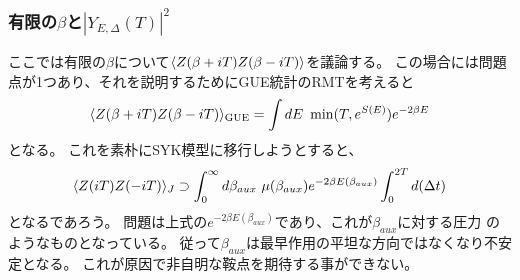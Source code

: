 \subsubsection{有限の$\beta$と$|Y_{E,\Delta}(T)|^2$}
ここでは有限の$\beta$について$\langle Z(\beta + iT)Z(\beta - iT) \rangle$を議論する。
この場合には問題点が1つあり、それを説明するためにGUE統計のRMTを考えると
\begin{align}
	\langle Z(\beta + iT)Z(\beta - iT) \rangle_{\mathrm{GUE}}
	=\int dE\ \min(T, e^{S(E)})e^{-2\beta E}
\end{align}
となる。
これを素朴にSYK模型に移行しようとすると、
\begin{align}
	\langle Z(iT)Z(-iT) \rangle_J \supset
	\int_0^{\infty}d\beta_{aux}\ \mu(\beta_{aux})e^{-2\beta E(\beta_{aux})}
	\int_0^{2T} d(\Delta t)
\end{align}
となるであろう。
問題は上式の$e^{-2\beta E(\beta_{aux})}$であり、これが$\beta_{aux}$に対する圧力
のようなものとなっている。
従って$\beta_{aux}$は最早作用の平坦な方向ではなくなり不安定となる。
これが原因で非自明な鞍点を期待する事ができない。

